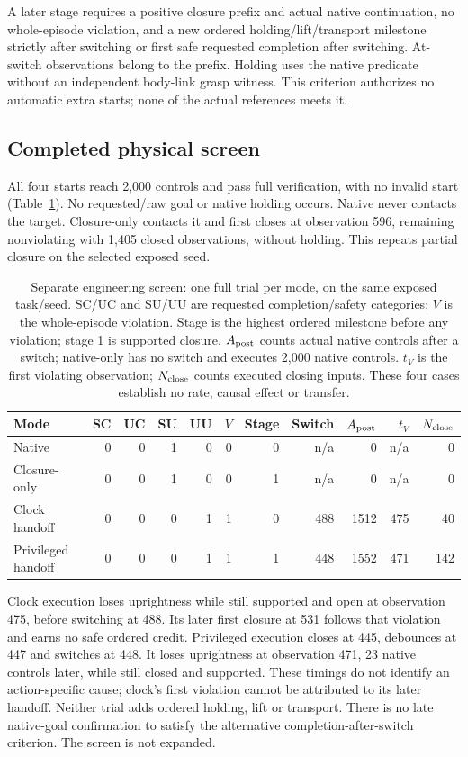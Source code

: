 A later stage requires a positive closure prefix and actual native continuation,
no whole-episode violation, and a new ordered holding/lift/transport milestone
strictly after switching or first safe requested completion after switching.
At-switch observations belong to the prefix. Holding uses the native predicate
without an independent body-link grasp witness. This criterion authorizes no
automatic extra starts; none of the actual references meets it.

\subsection{Completed physical screen}
All four starts reach 2,000 controls and pass full verification, with no invalid
start (Table~\ref{tab:screen}). No requested/raw goal or native holding occurs.
Native never contacts the target. Closure-only contacts it and first closes at
observation 596, remaining nonviolating with 1,405 closed observations, without
holding. This repeats partial closure on the selected exposed seed.

\begin{table}[t]
\caption{Separate engineering screen: one full trial per mode, on the same exposed
task/seed. SC/UC and SU/UU are requested completion/safety categories; $V$ is the
whole-episode violation. Stage is the highest ordered milestone before any
violation; stage 1 is supported closure. $A_{\rm post}$ counts actual native
controls after a switch; native-only has no switch and executes 2,000 native
controls. $t_V$ is the first violating observation; $N_{\rm close}$ counts executed
closing inputs. These four cases establish no rate, causal effect or transfer.}
\label{tab:screen}
\begin{tabular}{lrrrrrrrrrr}
\toprule
Mode & SC & UC & SU & UU & $V$ & Stage & Switch & $A_{\rm post}$ & $t_V$ & $N_{\rm close}$ \\
\midrule
Native & 0 & 0 & 1 & 0 & 0 & 0 & n/a & 0 & n/a & 0 \\
Closure-only & 0 & 0 & 1 & 0 & 0 & 1 & n/a & 0 & n/a & 0 \\
Clock handoff & 0 & 0 & 0 & 1 & 1 & 0 & 488 & 1512 & 475 & 40 \\
Privileged handoff & 0 & 0 & 0 & 1 & 1 & 1 & 448 & 1552 & 471 & 142 \\
\bottomrule
\end{tabular}
\end{table}

Clock execution loses uprightness while still supported and open at observation
475, before switching at 488. Its later first closure at 531 follows that
violation and earns no safe ordered credit. Privileged execution closes at 445,
debounces at 447 and switches at 448. It loses uprightness at observation 471,
23 native controls later, while still closed and supported. These timings do
not identify an action-specific cause; clock's first violation cannot be
attributed to its later handoff. Neither trial adds ordered holding, lift or
transport. There is no late native-goal confirmation to satisfy the alternative
completion-after-switch criterion. The screen is not expanded.

